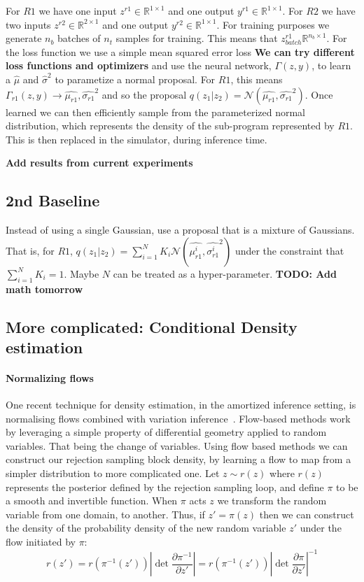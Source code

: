 \documentclass{article}
\begin{document}
For $R1$ we have one input $z^{r1} \in \mathbb{R}^{1 \times 1}$ and one output $y^{r1} \in \mathbb{R}^{1 \times 1}$.
For $R2$ we have two inputs $z^{r2} \in \mathbb{R}^{2 \times 1}$ and one output $y^{r2} \in \mathbb{R}^{1 \times 1}$.
For training purposes we generate $n_{b}$ batches of $n_{t}$ samples for training. 
This means that $z^{r1}_{batch}\mathbb{R}^{n_{b} \times 1}$. 
For the loss function we use a simple mean squared error loss \textbf{We can try different loss 
functions and optimizers} and use the
neural network, $\Gamma(z, y)$, to learn a $\hat{\mu}$ and $\hat{\sigma}^{2}$ to parametize 
a normal proposal. For $R1$, this means $\Gamma_{r1}(z,y) \rightarrow \hat{\mu_{r1}},  \hat{\sigma_{r1}}^{2}$  
and so the proposal $q(z_{1} | z_{2}) = \mathcal{N}(\hat{\mu_{r1}},  \hat{\sigma_{r1}}^{2})$. 
Once learned we can then efficiently sample from the parameterized normal distribution, which
represents the density of the sub-program represented by $R1$. 
This is then replaced in the simulator, during inference time. 

\textbf{Add results from current experiments}

\subsection{2nd Baseline}
Instead of using a single Gaussian, use a proposal that is a mixture of Gaussians. 
That is, for $R1$,   $q(z_{1} | z_{2}) = \sum^{N}_{i=1}K_{i}\mathcal{N}(\hat{\mu^{i}_{r1}},  \hat{\sigma^{i}_{r1}}^{2})$
under the constraint that $\sum^{N}_{i=1}K_{i} = 1$. Maybe $N$ can be treated as a hyper-parameter. 
\textbf{TODO: Add math tomorrow}
\subsection{More complicated: Conditional Density estimation}


\paragraph{Normalizing flows} One recent technique for density estimation, in the amortized inference setting,
is normalising flows combined with variation inference~\cite{rezende2015variational}.
Flow-based methods work by leveraging a simple property of differential geometry applied 
to random variables. 
That being the change of variables. 
Using flow based methods we can construct our rejection sampling block density, by learning a flow to map from
a simpler distribution to more complicated one.
Let $z \sim r(z)$ where $r(z)$ represents the posterior defined by the rejection
sampling loop, and define $\pi$ to be a smooth and invertible function.
When $\pi$ acts $z$ we transform the random variable from one domain, to another. 
Thus, if $z\prime = \pi(z)$ then we can construct the density of  
the probability density of the new random variable $z\prime$ under the flow initiated by $\pi$: 
\begin{equation}
r(z\prime) = r(\pi^{-1}(z\prime)) \left|\det \frac{\partial \pi^{-1}}{\partial z'}\right| = r(\pi^{-1}(z\prime)) \left|\det \frac{\partial \pi}{\partial z\prime}\right|^{-1} 
\end{equation}
\end{document}
